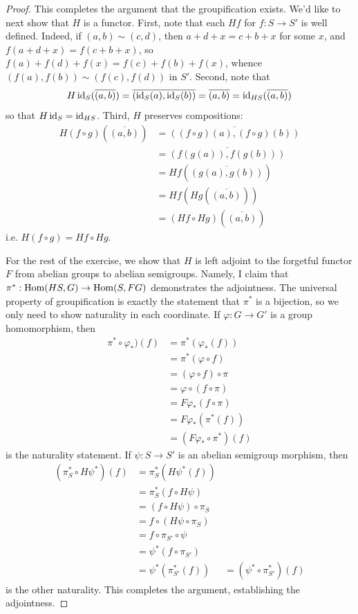 \documentclass[12pt]{exam}
\begin{document}
\begin{proof}
	This completes the argument that the groupification exists. We'd like to next show that $H$ is a functor. First, note that each $Hf$ for $f : S \to S'$ is well defined. Indeed, if $(a,b) \sim (c,d)$, then $a+d+x = c+b+x$ for some $x$, and $f(a+d+x) = f(c+b+x)$, so $f(a)+f(d)+f(x) = f(c)+f(b)+f(x)$, whence $(f(a),f(b)) \sim (f(c),f(d))$ in $S'$. Second, note that
	\[ H\operatorname{id}_S(\overline{(a,b)}) = \overline{(\operatorname{id}_S(a),\operatorname{id}_S(b))} = \overline{(a,b)} = \operatorname{id}_{HS}(\overline{(a,b)}) \]
	so that $H\operatorname{id}_S = \operatorname{id}_{HS}$. Third, $H$ preserves compositions:
	\begin{align*}
	H(f \circ g)(\overline{(a,b)})
		&= \overline{((f \circ g)(a),(f \circ g)(b))} \\
		&= \overline{(f(g(a)),f(g(b)))} \\
		&= Hf(\overline{(g(a),g(b))}) \\
		&= Hf(Hg(\overline{(a,b)})) \\
		&= (Hf \circ Hg)(\overline{(a,b)})
	\end{align*}
	i.e. $H(f \circ g) = Hf \circ Hg$.
	
	For the rest of the exercise, we show that $H$ is left adjoint to the forgetful functor $F$ from abelian groups to abelian semigroups. Namely, I claim that $\pi^\ast : \operatorname{Hom}(HS,G) \to \operatorname{Hom}(S,FG)$ demonstrates the adjointness. The universal property of groupification is exactly the statement that $\pi^\ast$ is a bijection, so we only need to show naturality in each coordinate. If $\varphi : G \to G'$ is a group homomorphism, then
	\begin{align*}
	\pi^\ast \circ \varphi_\ast)(f)
		&= \pi^\ast(\varphi_\ast(f)) \\
		&= \pi^\ast(\varphi \circ f) \\
		&= (\varphi \circ f) \circ \pi \\
		&= \varphi \circ (f \circ \pi) \\
		&= F\varphi_\ast(f \circ \pi) \\
		&= F\varphi_\ast(\pi^\ast(f)) \\
		&= (F\varphi_\ast \circ \pi^\ast)(f)
	\end{align*}
	is the naturality statement. If $\psi : S \to S'$ is an abelian semigroup morphism, then
	\begin{align*}
	(\pi_S^\ast \circ H\psi^\ast)(f)
		&= \pi_S^\ast(H\psi^\ast(f)) \\
		&= \pi_S^\ast(f \circ H\psi) \\
		&= (f \circ H\psi) \circ \pi_S \\
		&= f \circ (H\psi \circ \pi_S) \\
		&= f \circ \pi_{S'} \circ \psi \\
		&= \psi^\ast(f \circ \pi_{S'}) \\
		&= \psi^\ast(\pi_{S'}^\ast(f))
		&= (\psi^\ast \circ \pi_{S'}^\ast)(f)
	\end{align*}
	is the other naturality. This completes the argument, establishing the adjointness.
\end{proof}
\end{document}
